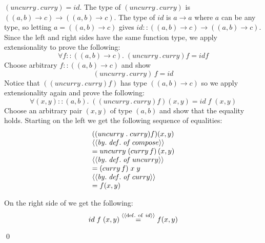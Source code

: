 \documentclass[11pt]{article}
\begin{document}
\begin{theorem}
$(uncurry\,.\,curry) = id$.  \Proof The type of $(uncurry\,.\,curry)$ is
$((a,b)\rightarrow{}c)\rightarrow((a,b)\rightarrow{}c)$. The type of $id$ is
$a\rightarrow{}a$ where $a$ can be any type, so letting
$a=((a,b)\rightarrow{}c)$ gives $id
::((a,b)\rightarrow{}c)\rightarrow((a,b)\rightarrow{}c)$.  Since the left and
right sides have the same function type, we apply extensionality to prove the
following:
\[\forall{}f::((a,b)\rightarrow{}c).\; (uncurry\,.\,curry) f = id f\]
Choose arbitrary $f::((a,b)\rightarrow{}c)$ and show
\[(uncurry\,.\,curry)\, f = id \]
Notice that $((uncurry\,.\,curry) f)$ has type $((a,b)\rightarrow{}c)$ so we
apply extensionality again and prove the following:
\[\forall{}(x,y)::(a,b).\;((uncurry\,.\,curry) f) (x,y) = id \;f\; (x,y)\]
Choose an arbitrary pair $(x,y)$ of type $(a,b)$ and show that 
the equality holds.  Starting on the left we get the following sequence of equalities:
\[\begin{array}{l}
((uncurry\;.\;curry) f) (x,y) \\
{{\small{\langle\langle{\mathit{by.\;def.\;of\;}}{compose}\rangle\rangle}}} \\
= uncurry \;(curry\, f)\, (x,y)\\
 {{\small{\langle\langle{\mathit{by.\;def.\;of\;}}{uncurry}\rangle\rangle}}} \\
= (curry\, f)\; x\; y \\
 {\small{\langle\langle{\mathit{by.\;def.\;of\;}}{curry}\rangle\rangle}} \\
= f(x, y)
\end{array}\]

On the right side of we get the following:
\[id\;f\;(x,y) \stackrel{\langle\langle{{\rm{def.\ of\ }}{id}}\rangle\rangle}{=} f(x,y)\]

\qed

\end{theorem}



\end{document}
